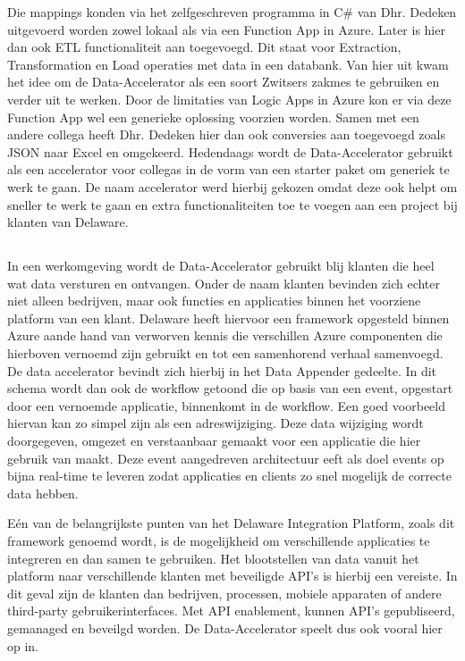 Die mappings konden via het zelfgeschreven programma in C# van Dhr. Dedeken uitgevoerd worden zowel lokaal als via een Function App in Azure. Later is hier dan ook ETL functionaliteit aan toegevoegd. Dit staat voor Extraction, Transformation en Load operaties met data in een databank. Van hier uit kwam het idee om de Data-Accelerator als een soort Zwitsers zakmes te gebruiken en verder uit te werken. Door de limitaties van Logic Apps in Azure kon er via deze Function App wel een generieke oplossing voorzien worden. Samen met een andere collega heeft Dhr. Dedeken hier dan ook conversies aan toegevoegd zoals JSON naar Excel en omgekeerd. Hedendaags wordt de Data-Accelerator gebruikt als een accelerator voor collegas in de vorm van een starter paket om generiek te werk te gaan. De naam accelerator werd hierbij gekozen omdat deze ook helpt om sneller te werk te gaan en extra functionaliteiten toe te voegen aan een project bij klanten van Delaware.\autocite{LopezNovoa2015}

\subsection{}%
\label{sec:Werkomgeving}

In een werkomgeving wordt de Data-Accelerator gebruikt blij klanten die heel wat data versturen en ontvangen. Onder de naam klanten bevinden zich echter niet alleen bedrijven, maar ook functies en applicaties binnen het voorziene platform van een klant. Delaware heeft hiervoor een framework opgesteld binnen Azure aande hand van verworven kennis die verschillen Azure componenten die hierboven vernoemd zijn gebruikt en tot een samenhorend verhaal samenvoegd. De data accelerator bevindt zich hierbij in het Data Appender gedeelte. In dit schema wordt dan ook de workflow getoond die op basis van een event, opgestart door een vernoemde applicatie, binnenkomt in de workflow. Een goed voorbeeld hiervan kan zo simpel zijn als een adreswijziging. Deze data wijziging wordt doorgegeven, omgezet en verstaanbaar gemaakt voor een applicatie die hier gebruik van maakt. Deze event aangedreven architectuur eeft als doel events op bijna real-time te leveren zodat applicaties en clients zo snel mogelijk de correcte data hebben.

Eén van de belangrijkste punten van het Delaware Integration Platform, zoals dit framework genoemd wordt, is de mogelijkheid om verschillende applicaties te integreren en dan samen te gebruiken. Het blootstellen van data vanuit het platform naar verschillende klanten met beveiligde API's is hierbij een vereiste. In dit geval zijn de klanten dan bedrijven, processen, mobiele apparaten of andere third-party gebruikerinterfaces. Met API enablement, kunnen API's gepubliseerd, gemanaged en beveilgd worden. De Data-Accelerator speelt dus ook vooral hier op in.


